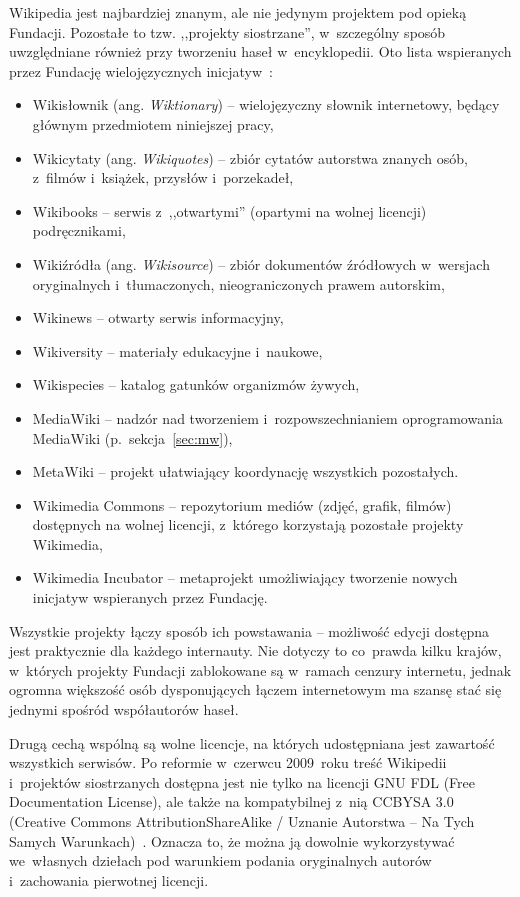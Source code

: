Wikipedia jest najbardziej znanym, ale nie jedynym projektem pod opieką Fundacji. Pozostałe to tzw. ,,projekty siostrzane'', w~szczególny sposób uwzględniane również przy tworzeniu haseł w~encyklopedii. Oto lista wspieranych przez Fundację wielojęzycznych inicjatyw~\cite{wm:main}:
\begin{itemize}
	\item Wikisłownik (ang. \emph{Wiktionary}) -- wielojęzyczny słownik internetowy, będący głównym przedmiotem niniejszej pracy,
	\item Wikicytaty (ang. \emph{Wikiquotes}) -- zbiór cytatów autorstwa znanych osób, z~filmów i~książek, przysłów i~porzekadeł,
	\item Wikibooks -- serwis z~,,otwartymi'' (opartymi na wolnej licencji) podręcznikami,
	\item Wikiźródła (ang. \emph{Wikisource}) -- zbiór dokumentów źródłowych w~wersjach oryginalnych i~tłumaczonych, nieograniczonych prawem autorskim,
	\item Wikinews -- otwarty serwis informacyjny,
	\item Wikiversity -- materiały edukacyjne i~naukowe,
	\item Wikispecies -- katalog gatunków organizmów żywych,
	\item MediaWiki -- nadzór nad tworzeniem i~rozpowszechnianiem oprogramowania MediaWiki (p.~sekcja~\ref{sec:mw}),
	\item Meta\dywiz{}Wiki -- projekt ułatwiający koordynację wszystkich pozostałych.
	\item Wikimedia Commons -- repozytorium mediów (zdjęć, grafik, filmów) dostępnych na wolnej licencji, z~którego korzystają pozostałe projekty Wikimedia,
	\item Wikimedia Incubator -- metaprojekt umożliwiający tworzenie nowych inicjatyw wspieranych przez Fundację.
\end{itemize}
Wszystkie projekty łączy sposób ich powstawania -- możliwość edycji dostępna jest praktycznie dla każdego internauty. Nie dotyczy to co~prawda kilku krajów, w~których projekty Fundacji zablokowane są w~ramach cenzury internetu, jednak ogromna większość osób dysponujących łączem internetowym ma szansę stać się jednymi spośród współautorów haseł.

Drugą cechą wspólną są wolne licencje, na których udostępniana jest zawartość wszystkich serwisów. Po reformie w~czerwcu 2009~roku treść Wikipedii i~projektów siostrzanych dostępna jest nie tylko na licencji GNU FDL (Free Documentation License), ale także na kompatybilnej z~nią CC\dywiz{}BY\dywiz{}SA 3.0 (Creative Commons Attribution\dywiz{}ShareAlike / Uznanie Autorstwa -- Na Tych Samych Warunkach)~\cite{wiki:license}. Oznacza to, że można ją dowolnie wykorzystywać we~własnych dziełach pod warunkiem podania oryginalnych autorów i~zachowania pierwotnej licencji.

